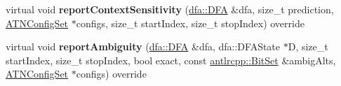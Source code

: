 \begin{DoxyCompactItemize}
\item 
\mbox{\label{classantlr4_1_1atn_1_1ProfilingATNSimulator_abd11027484af73b41b01bfa2e3a6f721}} 
virtual void {\bfseries report\+Context\+Sensitivity} (\hyperlink{classantlr4_1_1dfa_1_1DFA}{dfa\+::\+D\+FA} \&dfa, size\+\_\+t prediction, \hyperlink{classantlr4_1_1atn_1_1ATNConfigSet}{A\+T\+N\+Config\+Set} $\ast$configs, size\+\_\+t start\+Index, size\+\_\+t stop\+Index) override
\item 
\mbox{\label{classantlr4_1_1atn_1_1ProfilingATNSimulator_aa3eea846d54eff30cf00d36ec404481d}} 
virtual void {\bfseries report\+Ambiguity} (\hyperlink{classantlr4_1_1dfa_1_1DFA}{dfa\+::\+D\+FA} \&dfa, dfa\+::\+D\+F\+A\+State $\ast$D, size\+\_\+t start\+Index, size\+\_\+t stop\+Index, bool exact, const \hyperlink{classantlrcpp_1_1BitSet}{antlrcpp\+::\+Bit\+Set} \&ambig\+Alts, \hyperlink{classantlr4_1_1atn_1_1ATNConfigSet}{A\+T\+N\+Config\+Set} $\ast$configs) override
\end{DoxyCompactItemize}
